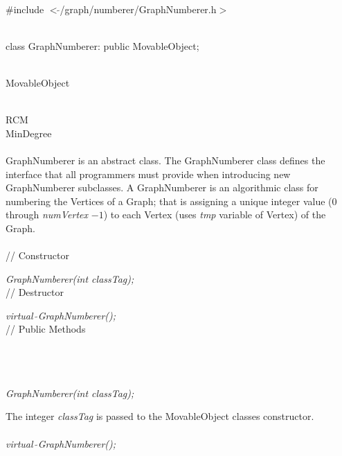 

   \\
\#include $<\tilde{ }$/graph/numberer/GraphNumberer.h$>$  


  \\
class GraphNumberer: public MovableObject; 


 \\
MovableObject 

\indent{} \\
\indent\indent\indent RCM \\
\indent\indent\indent MinDegree \\

  \\
\indent GraphNumberer is an abstract class. The GraphNumberer
class defines the interface that all programmers must provide when
introducing new GraphNumberer subclasses. A GraphNumberer is an
algorithmic class for numbering the Vertices of a Graph; that is
assigning a unique integer value ($0$ through {\em numVertex} $-1$) to
each Vertex (uses {\em tmp} variable of Vertex) of the Graph. \\


  \\
// Constructor  

{\em GraphNumberer(int classTag);}  \\ 

// Destructor  

{\em virtual~$\tilde{}$GraphNumberer();}  \\ 

// Public Methods   

\\
\\


  \\
{\em GraphNumberer(int classTag);}  

The integer {\em classTag} is passed to the MovableObject classes
constructor.\\ 

  \\
{\em virtual~$\tilde{}$GraphNumberer();}  

